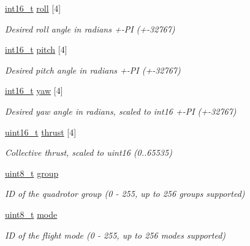 \begin{DoxyCompactItemize}
\item 
\hyperlink{stdint_8h_aa343fa3b3d06292b959ffdd4c4703b06}{int16\-\_\-t} \hyperlink{struct____mavlink__set__quad__swarm__roll__pitch__yaw__thrust__t_af834f144fd399bca28dddcd4a51df62e}{roll} \mbox{[}4\mbox{]}
\begin{DoxyCompactList}\small\item\em Desired roll angle in radians +-\/\-P\-I (+-\/32767) \end{DoxyCompactList}\item 
\hyperlink{stdint_8h_aa343fa3b3d06292b959ffdd4c4703b06}{int16\-\_\-t} \hyperlink{struct____mavlink__set__quad__swarm__roll__pitch__yaw__thrust__t_a6e84b733aa9481afc75bea48377b3a15}{pitch} \mbox{[}4\mbox{]}
\begin{DoxyCompactList}\small\item\em Desired pitch angle in radians +-\/\-P\-I (+-\/32767) \end{DoxyCompactList}\item 
\hyperlink{stdint_8h_aa343fa3b3d06292b959ffdd4c4703b06}{int16\-\_\-t} \hyperlink{struct____mavlink__set__quad__swarm__roll__pitch__yaw__thrust__t_a23901a88a5b06f83d2854b47a15cc1fa}{yaw} \mbox{[}4\mbox{]}
\begin{DoxyCompactList}\small\item\em Desired yaw angle in radians, scaled to int16 +-\/\-P\-I (+-\/32767) \end{DoxyCompactList}\item 
\hyperlink{stdint_8h_a273cf69d639a59973b6019625df33e30}{uint16\-\_\-t} \hyperlink{struct____mavlink__set__quad__swarm__roll__pitch__yaw__thrust__t_a66b74437a0604241f05a4939a400b53a}{thrust} \mbox{[}4\mbox{]}
\begin{DoxyCompactList}\small\item\em Collective thrust, scaled to uint16 (0..65535) \end{DoxyCompactList}\item 
\hyperlink{stdint_8h_aba7bc1797add20fe3efdf37ced1182c5}{uint8\-\_\-t} \hyperlink{struct____mavlink__set__quad__swarm__roll__pitch__yaw__thrust__t_ac837a11de67fbc795765422af3441bfc}{group}
\begin{DoxyCompactList}\small\item\em I\-D of the quadrotor group (0 -\/ 255, up to 256 groups supported) \end{DoxyCompactList}\item 
\hyperlink{stdint_8h_aba7bc1797add20fe3efdf37ced1182c5}{uint8\-\_\-t} \hyperlink{struct____mavlink__set__quad__swarm__roll__pitch__yaw__thrust__t_ad5c5e1e904f27689534fb1075c2b8591}{mode}
\begin{DoxyCompactList}\small\item\em I\-D of the flight mode (0 -\/ 255, up to 256 modes supported) \end{DoxyCompactList}\end{DoxyCompactItemize}


